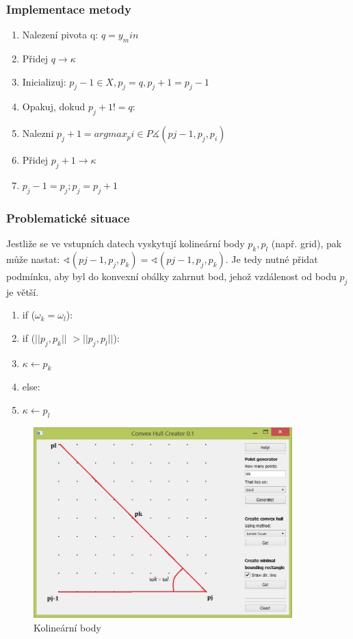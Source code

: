 \documentclass[a4paper, 12pt]{article}
\begin{document}
\subsubsection{Implementace metody}
\begin{enumerate}
\item Nalezení pivota q:  $ q = y_min $ 
\item Přidej $ q \longrightarrow \kappa $ 
\item Inicializuj: $p_j-1 \in X, p_j = q, p_j+1 = p_j-1$
\item Opakuj, dokud $p_j+1 != q: $
\item 	\hspace {1cm} Nalezni $p_j+1 = argmax_pi \in P \measuredangle (pj-1, p_j, p_i)$
\item 	\hspace {1cm} Přidej $p_j+1 \longrightarrow \kappa $
\item 	\hspace {1cm} $p_j-1 = p_j; p_j = p_j+1$
\clearpage
\end{enumerate}

\subsubsection{Problematické situace}
Jestliže se ve vstupních datech vyskytují kolineární body $p_k, p_l$ (např. grid), pak může nastat:  $\sphericalangle (pj-1, p_j, p_k) = \sphericalangle (pj-1, p_j, p_k)$. Je tedy nutné přidat podmínku, aby byl do konvexní obálky zahrnut bod, jehož vzdálenost od bodu $p_j$ je větší.

\begin{enumerate}
\item if ($\omega_k = \omega_l$):
\item \hspace{1cm} if ($||p_j, p_k||$ $>||p_j ,p_l||$):
\item \hspace{2cm} $\kappa \longleftarrow p_k$
\item \hspace{1cm} else:
\item \hspace{2cm} $\kappa \longleftarrow p_l$
\end{enumerate}

\begin{figure}[h]
	\centering
	\includegraphics[width=10cm]{JS.jpg}
	\caption{Kolineární body}
\end{figure}
\clearpage
\end{document}
